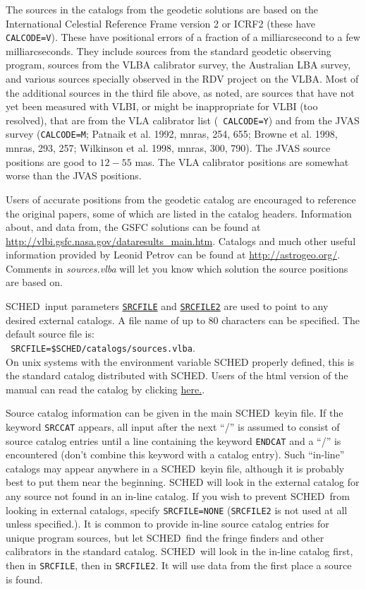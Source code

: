 \documentclass{report}
\newcommand{\sched}{{\sc SCHED}}
\newcommand{\schedb}{{\sc SCHED~}}
\begin{document}
The sources in the catalogs from the geodetic solutions are based on
the International Celestial Reference Frame version 2 or ICRF2 (these
have {\tt CALCODE=V}).  These have positional errors of a fraction of
a milliarcsecond to a few milliarcseconds.  They include sources from
the standard geodetic observing program, sources from the VLBA
calibrator survey, the Australian LBA survey, and various sources
specially observed in the RDV project on the VLBA.  Most of the
additional sources in the third file above, as noted, are sources that
have not yet been measured with VLBI, or might be inappropriate for
VLBI (too resolved), that are from the VLA calibrator list ({\tt
CALCODE=Y}) and from the JVAS survey ({\tt CALCODE=M}; Patnaik et
al. 1992, mnras, 254, 655; Browne et al. 1998, mnras, 293, 257;
Wilkinson et al. 1998, mnras, 300, 790).  The JVAS source positions
are good to $12-55$ mas.  The VLA calibrator positions are somewhat
worse than the JVAS positions.

Users of accurate positions from the geodetic catalog are encouraged
to reference the original papers, some of which are listed in the
catalog headers.  Information about, and data from, the GSFC solutions
can be found at
{\href{http://vlbi.gsfc.nasa.gov/dataresults\_main.htm}{http://vlbi.gsfc.nasa.gov/dataresults\_main.htm}}.
Catalogs and much
other useful information provided by Leonid Petrov can be found at
{\href{http://astrogeo.org/}{http://astrogeo.org/}}.
Comments in {\sl sources.vlba} will let you know which solution the
source positions are based on.

\schedb input parameters 
{\hyperref[MP:SRCFILE]{{\tt SRCFILE}}} and
{\hyperref[MP:SRCFILE2]{{\tt SRCFILE2}}} are used to point to any desired
external catalogs.  A file name of up to 80 characters can be
specified. The default source file is: \\ {\tt
SRCFILE=\$SCHED/catalogs/sources.vlba}.  \\ On unix systems with the
environment variable SCHED properly defined, this is the standard
catalog distributed with \sched.  Users of the html version of the
manual can read the catalog by clicking
{\href{catalogs/sources.vlba}{here.}}.

Source catalog information can be given in the main \schedb keyin
file. If the keyword {\tt SRCCAT} appears, all input after the next
``/'' is assumed to consist of source catalog entries until a line
 containing the keyword {\tt ENDCAT} and a ``/'' is encountered (don't
combine this keyword with a catalog entry).  Such ``in-line'' catalogs
may appear anywhere in a \schedb keyin file, although it is probably
best to put them near the beginning.  {\sc SCHED} will look in the
external catalog for any source not found in an in-line catalog.  If
you wish to prevent \schedb from looking in external catalogs, specify
{\tt SRCFILE=NONE} ({\tt SRCFILE2} is not used at all unless
specified.).  It is common to provide in-line source catalog entries
for unique program sources, but let \schedb find the fringe finders
and other calibrators in the standard catalog.  \schedb will look in
the in-line catalog first, then in {\tt SRCFILE}, then in {\tt SRCFILE2}.
It will use data from the first place a source is found.
\end{document}
